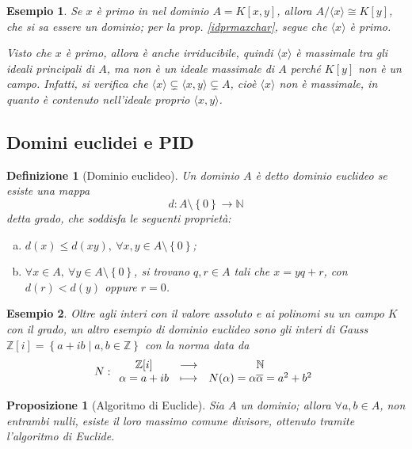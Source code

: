 \documentclass[11pt]{article}
\theoremstyle{style}
\newtheorem{esempio}{Esempio}[section]
\newtheorem{definizione}{Definizione}[section]
\newtheorem{prop}{Proposizione}[section]
\numberwithin{equation}{subsection}
\begin{document}
\begin{esempio}
	Se $x$ \`e primo in nel dominio $A = K[x,y]$, allora $A / \langle x \rangle\cong K[y]$, che si sa essere un dominio; per la prop. \ref{idprmaxchar}, segue che $\langle x \rangle$ \`e primo.

	Visto che $x$ \`e primo, allora \`e anche irriducibile, quindi $\langle x \rangle$ \`e massimale tra gli ideali principali di $A$, ma non \`e un ideale massimale di $A$ perch\'e $K[y]$ non \`e un campo. 
	Infatti, si verifica che $\langle x  \rangle\subsetneq \langle x,y \rangle \subsetneq A$, cio\`e $\langle x \rangle$ non \`e massimale, in quanto \`e contenuto nell'ideale proprio $\langle x,y \rangle$.
\end{esempio}
\subsection{Domini euclidei e PID}
\begin{definizione}
	[Dominio euclideo]
	Un dominio $A$ \`e detto \textit{dominio euclideo} se esiste una mappa
	\[
	d : A \setminus\left\{ 0 \right\} \longrightarrow \mathbb{N}
	\] 
	detta \textit{grado}, che soddisfa le seguenti propriet\`a:
	\begin{enumerate}[(a).]
		\item $d(x) \le d(xy), \ \forall x,y \in A\setminus\left\{ 0 \right\} $;
		\item $\forall x \in A, \ \forall y \in A\setminus\left\{ 0 \right\} $, si trovano $q,r \in A$ tali che $x = yq + r$, con $d(r)<d(y)$ oppure $r=0$.
	\end{enumerate}
\end{definizione}
\begin{esempio}
	Oltre agli interi con il valore assoluto e ai polinomi su un campo $K$ con il grado, un altro esempio di dominio euclideo sono gli interi di Gauss $\mathbb{Z}[i] = \left\{ a + ib  \mid a,b \in \mathbb{Z} \right\} $ con la norma data da
	\[
	N :
	\begin{array}
		{c c c}
		\mathbb{Z}[i] &\longrightarrow & \mathbb{N}\\
		\alpha = a+ib &\longmapsto & N(\alpha ) = \alpha  \overline{\alpha }=a^2 + b^2
	\end{array}
	\] 
\end{esempio}
\begin{prop}
	[Algoritmo di Euclide]
	Sia $A$ un dominio; allora $\forall a,b \in A$, non entrambi nulli, esiste il loro massimo comune divisore, ottenuto tramite l'algoritmo di Euclide.
\end{prop}
\end{document}
